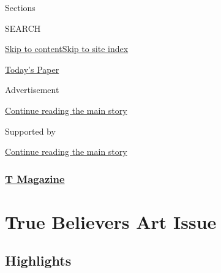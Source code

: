 Sections

SEARCH

\protect\hyperlink{site-content}{Skip to
content}\protect\hyperlink{site-index}{Skip to site index}

\href{https://myaccount.nytimes.com/auth/login?response_type=cookie\&client_id=vi}{}

\href{https://www.nytimes.com/section/todayspaper}{Today's Paper}

Advertisement

\protect\hyperlink{after-top}{Continue reading the main story}

Supported by

\protect\hyperlink{after-sponsor}{Continue reading the main story}

\hypertarget{t-magazine}{%
\subsubsection{\texorpdfstring{\href{/section/t-magazine}{T
Magazine}}{T Magazine}}\label{t-magazine}}

\hypertarget{true-believers-art-issue}{%
\section{True Believers Art Issue}\label{true-believers-art-issue}}

\hypertarget{highlights}{%
\subsection{Highlights}\label{highlights}}

